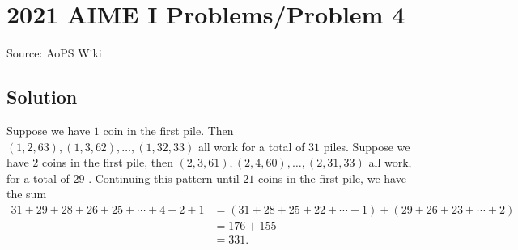\documentclass[12pt]{article}
\begin{document}
\section*{{2021 AIME I Problems/Problem 4}}
Source: AoPS Wiki

\subsection*{Solution}
Suppose we have $1$ coin in the first pile. Then $(1, 2, 63), (1, 3, 62), \ldots, (1, 32, 33)$ all work for a total of $31$ piles. Suppose we have $2$ coins in the first pile, then $(2, 3, 61), (2, 4, 60), \ldots, (2, 31, 33)$ all work, for a total of $29$ . Continuing this pattern until $21$ coins in the first pile, we have the sum \begin{align*} 31+29+28+26+25+\cdots+4+2+1 &= (31+28+25+22+\cdots+1)+(29+26+23+\cdots+2) \\ &= 176+155 \\ &= \boxed{331}. \end{align*}
\end{document}
